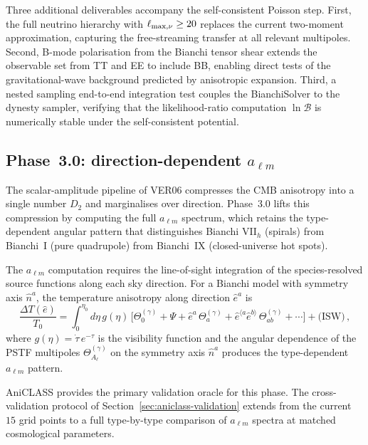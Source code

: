 Three additional deliverables accompany the
self-consistent Poisson step.
First, the full neutrino hierarchy with
$\ell_{\rm max,\nu} \geq 20$ replaces the current
two-moment approximation, capturing the free-streaming
transfer at all relevant multipoles.
Second, B-mode polarisation from the Bianchi tensor shear
extends the observable set from TT and EE to include BB,
enabling direct tests of the gravitational-wave
background predicted by anisotropic expansion.
Third, a nested sampling end-to-end integration test
couples the BianchiSolver to the dynesty sampler,
verifying that the likelihood-ratio computation
$\ln \mathcal{B}$ is numerically stable under the
self-consistent potential.


\subsection{Phase~3.0: direction-dependent $a_{\ell m}$}
\label{sec:phase30}

The scalar-amplitude pipeline of VER06 compresses the
CMB anisotropy into a single number $D_2$ and marginalises
over direction.  Phase~3.0 lifts this compression by
computing the full $a_{\ell m}$ spectrum, which retains
the type-dependent angular pattern that distinguishes
Bianchi VII$_h$ (spirals) from Bianchi~I (pure
quadrupole) from Bianchi~IX (closed-universe hot spots).

The $a_{\ell m}$ computation requires the line-of-sight
integration of the species-resolved source functions
along each sky direction.  For a Bianchi model with
symmetry axis $\hat{n}^a$, the temperature anisotropy
along direction $\hat{e}^a$ is
\begin{equation}\label{eq:alm-los}
\frac{\Delta T(\hat{e})}{T_0}
= \int_0^{\eta_0} d\eta\,
  g(\eta)\,\big[
  \Theta^{(\gamma)}_0
  + \Psi
  + \hat{e}^a\, \Theta^{(\gamma)}_a
  + \hat{e}^{\langle a}\hat{e}^{b\rangle}\,
    \Theta^{(\gamma)}_{ab}
  + \cdots
  \big]
+ \text{(ISW)}\,,
\end{equation}
where $g(\eta) = \dot{\tau}\, e^{-\tau}$ is the
visibility function and the angular dependence of the
PSTF multipoles $\Theta^{(\gamma)}_{A_\ell}$ on the
symmetry axis $\hat{n}^a$ produces the type-dependent
$a_{\ell m}$ pattern.

AniCLASS provides the primary validation oracle for
this phase.  The cross-validation protocol of
Section~\ref{sec:aniclass-validation} extends from the
current $15$ grid points to a full type-by-type
comparison of $a_{\ell m}$ spectra at matched
cosmological parameters.


